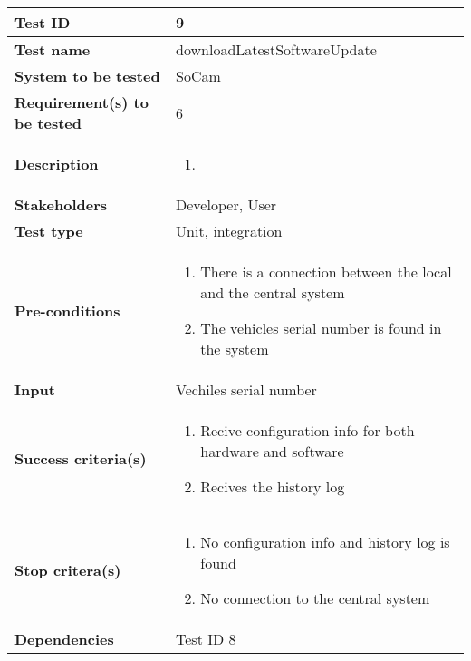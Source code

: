 	\begin{table}[H]
			\begin{tabular}{| p{4cm} | p{10cm} |}
			\hline
			\rowcolor{gray}
				{\bf Test ID} & 9 \\ \hline
				{\bf Test name} & downloadLatestSoftwareUpdate \\ \hline
				{\bf System to be tested} & SoCam \\ \hline
				{\bf Requirement(s) to be tested} & 6 \\ \hline
				{\bf Description} & 
					\begin{enumerate}
						\item
					\end{enumerate}
				\\ \hline
				{\bf Stakeholders} & Developer, User \\ \hline
				{\bf Test type} & Unit, integration \\ \hline
				{\bf Pre-conditions} & 
					\begin{enumerate}
						\item There is a connection between the local and the central system
						\item The vehicles serial number is found in the system
					\end{enumerate}\\ \hline
				{\bf Input} &  Vechiles serial number \\ \hline
				{\bf Success criteria(s)} & 
					\begin{enumerate}
						\item Recive configuration info for both hardware and software
						\item Recives the history log
					\end{enumerate}
				\\ \hline
				{\bf Stop critera(s)} &  
					\begin{enumerate}
						\item No configuration info and history log is found
						\item No connection to the central system
					\end{enumerate} \\ \hline
				{\bf Dependencies} & Test ID 8 \\ \hline
			\end{tabular}
		\end{table}

